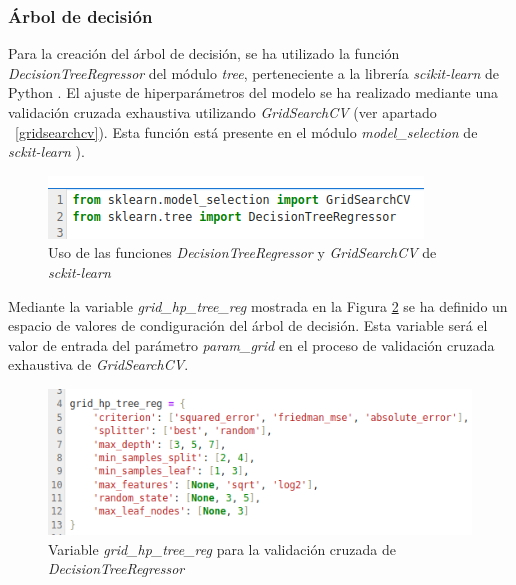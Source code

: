 \documentclass[12pt,a4paper,Spanish]{article}
\begin{document}
\subsubsection{Árbol de decisión}
Para la creación del árbol de decisión, se ha utilizado la función \textit{DecisionTreeRegressor} del módulo \textit{tree}, perteneciente a la librería \textit{scikit-learn} de Python \cite{scikit-learn}.
\newline
El ajuste de hiperparámetros del modelo se ha realizado mediante una validación cruzada exhaustiva utilizando \textit{GridSearchCV} (ver apartado ~\ref{gridsearchcv}). Esta función está presente en el módulo \textit{model\_selection} de \textit{sckit-learn} \cite{scikit-learn}).
\begin{figure}[H]
	\centering
	\includegraphics[width=0.7\linewidth]{figs/import_tree}
	\caption{Uso de las funciones \textit{DecisionTreeRegressor} y \textit{GridSearchCV} de \textit{sckit-learn}}
	\label{fig:importtree}
\end{figure}
Mediante la variable \textit{grid\_hp\_tree\_reg} mostrada en la Figura \ref{fig:paramstree} se ha definido un espacio de valores de condiguración del árbol de decisión. Esta variable será el valor de entrada del parámetro \textit{param\_grid} en el proceso de validación cruzada exhaustiva de \textit{GridSearchCV}.
\begin{figure}[H]
	\centering
	\includegraphics[width=0.7\linewidth]{figs/params_tree}
	\caption{Variable \textit{grid\_hp\_tree\_reg} para la validación cruzada de \textit{DecisionTreeRegressor}}
	\label{fig:paramstree}
\end{figure}
\end{document}
